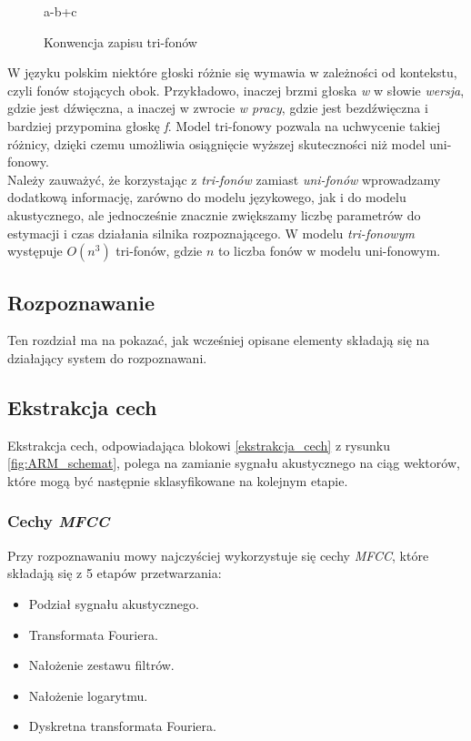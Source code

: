 \documentclass[11pt]{article}
\newcommand{\refBlock}[1]{%
	\hyperref[#1]{\ref*{#1}}%
}
\begin{document}
		\begin{figure}[H]
			\begin{center}
			{a-b+c}
			\end{center}
			\caption{Konwencja zapisu tri-fonów}
			\label{fig:tri-fony_notacja}
		\end{figure}
	
		W języku polskim niektóre głoski różnie się wymawia w zależności od kontekstu, czyli fonów stojących obok. Przykładowo, inaczej brzmi głoska \textit{w} w słowie \textit{wersja}, gdzie jest dźwięczna, a inaczej w zwrocie \textit{w pracy}, gdzie jest bezdźwięczna i bardziej przypomina głoskę \textit{f}. Model tri-fonowy pozwala na uchwycenie takiej różnicy, dzięki czemu umożliwia osiągnięcie wyższej skuteczności niż model uni-fonowy.
		\\
		Należy zauważyć, że korzystając z \textit{tri-fonów} zamiast \textit{uni-fonów} wprowadzamy dodatkową informację, zarówno do modelu językowego, jak i do modelu akustycznego, ale jednocześnie znacznie zwiększamy liczbę parametrów do estymacji i czas działania silnika rozpoznającego. W modelu \textit{tri-fonowym} występuje $O(n^3)$ tri-fonów, gdzie $n$ to liczba fonów w modelu uni-fonowym.  
		
	\subsection{ Rozpoznawanie }
		Ten rozdział ma na pokazać, jak wcześniej opisane elementy składają się na działający system do rozpoznawani.
	\subsection{ Ekstrakcja cech }

	 Ekstrakcja cech, odpowiadająca blokowi \refBlock{ekstrakcja_cech} z rysunku \ref{fig:ARM_schemat}, polega na zamianie sygnału akustycznego na ciąg wektorów, które mogą być następnie sklasyfikowane na kolejnym etapie. 
	 \subsubsection{Cechy \textit{MFCC}}
	 \label{sec:Feature_vec_mfcc}
	 Przy rozpoznawaniu mowy najczyściej wykorzystuje się cechy \textit{MFCC}, które składają się z 5 etapów przetwarzania:
	 
	 \begin{itemize}
	 	\item Podział sygnału akustycznego.
	 	\item Transformata Fouriera.
	 	\item Nałożenie zestawu filtrów.
	 	\item Nałożenie logarytmu. 
	 	\item Dyskretna transformata Fouriera.
	 \end{itemize}
 
\end{document}
